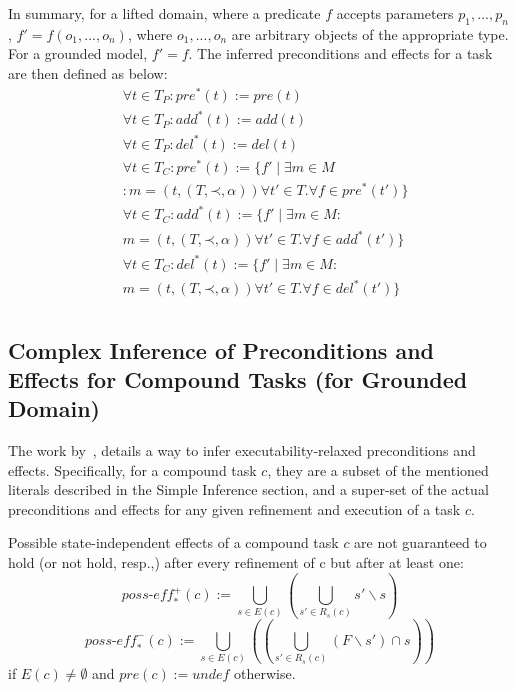 \documentclass[letterpaper]{article} %
\newcommand{\Pre} {\ensuremath{\mathit{pre}}}  %
\newcommand{\Add} {\ensuremath{\mathit{add}}}
\newcommand{\Del} {\ensuremath{\mathit{del}}}
\newcommand{\PreS} {\ensuremath{\mathit{pre^{*}}}}
\newcommand{\AddS} {\ensuremath{\mathit{add^{*}}}}
\newcommand{\DelS} {\ensuremath{\mathit{del^{*}}}}
\newcommand{\singlePrec} {\ensuremath{\mathit{ \mathord{\prec} }}}
\newcommand{\PossEffPlus} {\ensuremath{\mathit{\textit{poss-eff}^{+}_{*}}}}
\newcommand{\PossEffMinus} {\ensuremath{\mathit{\textit{poss-eff}^{-}_{*}}}}
\begin{document}
In summary, for a lifted domain, where a predicate $f$ accepts parameters $p_1, ..., p_n$, 
$f' = f(o_1, ..., o_n)$, where $o_1, ..., o_n$ are arbitrary objects of the appropriate type. For a grounded model, $f' = f$. The inferred preconditions and effects for a task are then defined as below:
\begin{align*}
& \forall t \in T_P : \PreS(t) := \Pre(t) \\
& \forall t \in T_P : \AddS(t) := \Add(t) \\
& \forall t \in T_P : \DelS(t) := \Del(t)  \\ %
& \forall t \in T_C : \PreS(t) := \{f'  \mid  \exists m \in M  \\
& : m=(t,(T, \singlePrec, \alpha)) \forall t' \in T.  \forall  f \in \PreS(t') \}   \\
& \forall t \in T_C : \AddS(t) := \{f'  \mid  \exists m \in M : \\
& m=(t,(T, \singlePrec, \alpha)) \forall t' \in T.  \forall  f \in \AddS(t') \}   \\
& \forall t \in T_C : \DelS(t) := \{f'  \mid  \exists m \in M : \\
& m=(t,(T, \singlePrec, \alpha)) \forall t' \in T.  \forall  f \in \DelS(t') \}   \\ 
\end{align*}



\subsection{Complex Inference of Preconditions and Effects for Compound Tasks (for Grounded Domain) }
The work by~\cite{ConnyPreEstimation}, details a way to infer executability-relaxed preconditions and effects. Specifically, for a compound task $c$, they are a subset of the mentioned literals described in the Simple Inference section, and a super-set of the actual preconditions and effects for any given refinement and execution of a task $c$.


Possible state-independent effects of a compound task $c$ are not guaranteed to hold (or not hold, resp.,)
after every refinement of c but after at least one:
$$ \PossEffPlus(c) := \bigcup_{s \in E(c)}  ( \bigcup_{s' \in R_s(c)}  s' \backslash s) $$
$$ \PossEffMinus(c) := \bigcup_{s \in E(c)} ((\bigcup_{s' \in R_s(c)} (F \backslash s') \cap s ))$$
if $E(c) \neq \emptyset$ and  $\Pre(c) := \ensuremath{\textit{undef}}$ otherwise.
\end{document}
